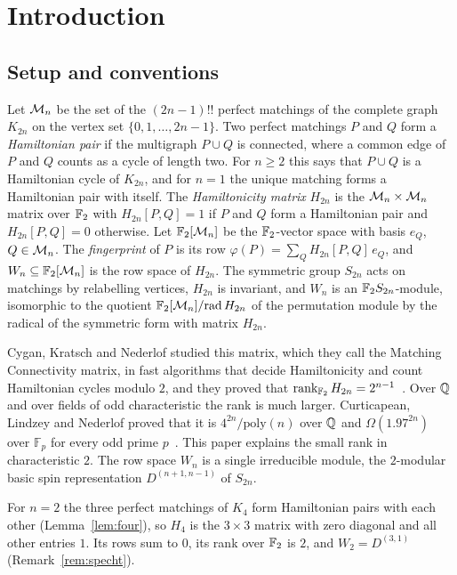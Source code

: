 \section{Introduction}\label{sec:intro}

\subsection{Setup and conventions}\label{subsec:setup}

Let $\mathcal{M}_n$ be the set of the $(2n-1)!!$ perfect matchings of the complete graph $K_{2n}$ on the vertex set $\{0,1,\dots,2n-1\}$. Two perfect matchings $P$ and $Q$ form a \emph{Hamiltonian pair} if the multigraph $P\cup Q$ is connected, where a common edge of $P$ and $Q$ counts as a cycle of length two. For $n\ge2$ this says that $P\cup Q$ is a Hamiltonian cycle of $K_{2n}$, and for $n=1$ the unique matching forms a Hamiltonian pair with itself. The \emph{Hamiltonicity matrix} $H_{2n}$ is the $\mathcal{M}_n\times\mathcal{M}_n$ matrix over $\mathbb{F}_2$ with $H_{2n}[P,Q]=1$ if $P$ and $Q$ form a Hamiltonian pair and $H_{2n}[P,Q]=0$ otherwise. Let $\mathbb{F}_2[\mathcal{M}_n]$ be the $\mathbb{F}_2$-vector space with basis $e_Q$, $Q\in\mathcal{M}_n$. The \emph{fingerprint} of $P$ is its row $\varphi(P)=\sum_{Q}H_{2n}[P,Q]\,e_Q$, and $W_n\subseteq\mathbb{F}_2[\mathcal{M}_n]$ is the row space of $H_{2n}$. The symmetric group $S_{2n}$ acts on matchings by relabelling vertices, $H_{2n}$ is invariant, and $W_n$ is an $\mathbb{F}_2 S_{2n}$-module, isomorphic to the quotient $\mathbb{F}_2[\mathcal{M}_n]/{\operatorname{rad} H_{2n}}$ of the permutation module by the radical of the symmetric form with matrix $H_{2n}$. %

Cygan, Kratsch and Nederlof studied this matrix, which they call the Matching Connectivity matrix, in fast algorithms that decide Hamiltonicity and count Hamiltonian cycles modulo $2$, and they proved that $\operatorname{rank}_{\mathbb{F}_2}H_{2n}=2^{n-1}$~\cite[Cor.~3.5]{CKN18}. Over $\mathbb{Q}$ and over fields of odd characteristic the rank is much larger. Curticapean, Lindzey and Nederlof proved that it is $4^{2n}/\mathrm{poly}(n)$ over $\mathbb{Q}$ and $\Omega(1.97^{2n})$ over $\mathbb F_p$ for every odd prime $p$~\cite{CLN17}. This paper explains the small rank in characteristic $2$. The row space $W_n$ is a single irreducible module, the $2$-modular basic spin representation $D^{(n+1,n-1)}$ of $S_{2n}$.

\begin{example}\label{ex:n2}
For $n=2$ the three perfect matchings of $K_4$ form Hamiltonian pairs with each other (Lemma~\ref{lem:four}), so $H_4$ is the $3\times3$ matrix with zero diagonal and all other entries $1$. Its rows sum to $0$, its rank over $\mathbb{F}_2$ is $2$, and $W_2=D^{(3,1)}$ (Remark~\ref{rem:specht}).
\end{example}

